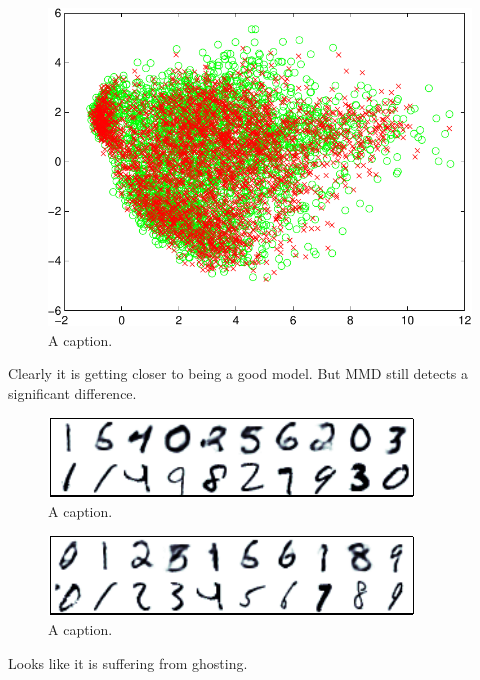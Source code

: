 \documentclass{article} %
\begin{document}
\begin{figure}[ht]
\centering
\includegraphics[width=0.98\columnwidth]{figures/dbn_ft_pca}
\caption{
A caption.
}
\label{fig:dbn_ft_pca}
\end{figure}

Clearly it is getting closer to being a good model.
But MMD still detects a significant difference.

\begin{figure}[ht]
\centering
\includegraphics[width=0.98\columnwidth]{figures/dbn_ft_witness_peaks}
\caption{
A caption.
}
\label{fig:dbn_ft_witness_peaks}
\end{figure}

\begin{figure}[ht]
\centering
\includegraphics[width=0.98\columnwidth]{figures/dbn_ft_cond}
\caption{
A caption.
}
\label{fig:dbn_ft_cond}
\end{figure}

Looks like it is suffering from ghosting.
\end{document}
